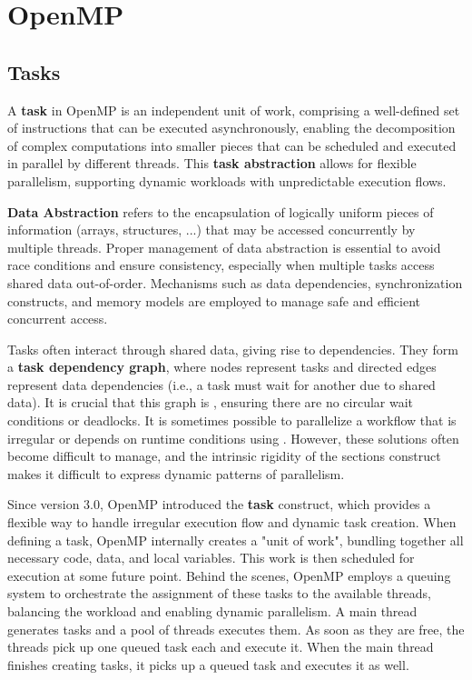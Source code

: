 \chapter{OpenMP}



\section{Tasks}

A \textbf{task} in OpenMP is an independent unit of work, comprising a well-defined set of instructions that can be executed asynchronously, enabling the decomposition of complex computations into smaller pieces that can be scheduled and executed in parallel by different threads. This \textbf{task abstraction} allows for flexible parallelism, supporting dynamic workloads with unpredictable execution flows.

\textbf{Data Abstraction} refers to the encapsulation of logically uniform pieces of information (arrays, structures, ...) that may be accessed concurrently by multiple threads. Proper management of data abstraction is essential to avoid race conditions and ensure consistency, especially when multiple tasks access shared data out-of-order. Mechanisms such as data dependencies, synchronization constructs, and memory models are employed to manage safe and efficient concurrent access.

Tasks often interact through shared data, giving rise to dependencies. They form a \textbf{task dependency graph}, where nodes represent tasks and directed edges represent data dependencies (i.e., a task must wait for another due to shared data). It is crucial that this graph is , ensuring there are no circular wait conditions or deadlocks.
It is sometimes possible to parallelize a workflow that is irregular or depends on runtime conditions using . However, these solutions often become difficult to manage, and the intrinsic rigidity of the sections construct makes it difficult to express dynamic patterns of parallelism.

Since version 3.0, OpenMP introduced the \textbf{task} construct, which provides a flexible way to handle irregular execution flow and dynamic task creation. When defining a task, OpenMP internally creates a "unit of work", bundling together all necessary code, data, and local variables. This work is then scheduled for execution at some future point. 
Behind the scenes, OpenMP employs a queuing system to orchestrate the assignment of these tasks to the available threads, balancing the workload and enabling dynamic parallelism.
A main thread generates tasks and a pool of threads executes them. As soon as they are free, the threads pick up one queued task each and execute it. When the main thread finishes creating tasks, it picks up a queued task and executes it as well.

